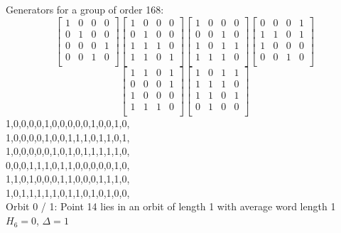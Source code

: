 {\small\arraycolsep=2pt
Generators for a group of order 168:
$$
\left[
\begin{array}{*{4}{r}}
1 & 0 & 0 & 0\\
0 & 1 & 0 & 0\\
0 & 0 & 0 & 1\\
0 & 0 & 1 & 0\\
\end{array}
\right]
\left[
\begin{array}{*{4}{r}}
1 & 0 & 0 & 0\\
0 & 1 & 0 & 0\\
1 & 1 & 1 & 0\\
1 & 1 & 0 & 1\\
\end{array}
\right]
\left[
\begin{array}{*{4}{r}}
1 & 0 & 0 & 0\\
0 & 0 & 1 & 0\\
1 & 0 & 1 & 1\\
1 & 1 & 1 & 0\\
\end{array}
\right]
\left[
\begin{array}{*{4}{r}}
0 & 0 & 0 & 1\\
1 & 1 & 0 & 1\\
1 & 0 & 0 & 0\\
0 & 0 & 1 & 0\\
\end{array}
\right]
$$
$$
\left[
\begin{array}{*{4}{r}}
1 & 1 & 0 & 1\\
0 & 0 & 0 & 1\\
1 & 0 & 0 & 0\\
1 & 1 & 1 & 0\\
\end{array}
\right]
\left[
\begin{array}{*{4}{r}}
1 & 0 & 1 & 1\\
1 & 1 & 1 & 0\\
1 & 1 & 0 & 1\\
0 & 1 & 0 & 0\\
\end{array}
\right]
$$
1,0,0,0,0,1,0,0,0,0,0,1,0,0,1,0,\\
1,0,0,0,0,1,0,0,1,1,1,0,1,1,0,1,\\
1,0,0,0,0,0,1,0,1,0,1,1,1,1,1,0,\\
0,0,0,1,1,1,0,1,1,0,0,0,0,0,1,0,\\
1,1,0,1,0,0,0,1,1,0,0,0,1,1,1,0,\\
1,0,1,1,1,1,1,0,1,1,0,1,0,1,0,0,\\
}
\noindent Orbit 0 / 1: Point 14 lies in an orbit of length 1 with average word length 1 $H_{6} = 0$, $\Delta = 1$\\
